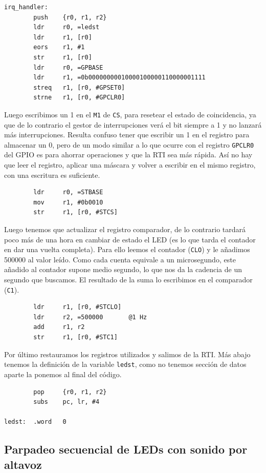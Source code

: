 \begin{lstlisting}
irq_handler:
        push    {r0, r1, r2}
        ldr     r0, =ledst
        ldr     r1, [r0]
        eors    r1, #1
        str     r1, [r0]
        ldr     r0, =GPBASE
        ldr     r1, =0b00000000010000100000110000001111
        streq   r1, [r0, #GPSET0]
        strne   r1, [r0, #GPCLR0]
\end{lstlisting}

Luego escribimos un 1 en el {\tt M1} de {\tt CS}, para resetear el estado de coincidencia, ya
que de lo contrario el gestor de interrupciones verá el bit siempre a 1 y no lanzará más
interrupciones. Resulta confuso tener que escribir un 1 en el registro para almacenar un 0, pero
de un modo similar a lo que ocurre con el registro {\tt GPCLR0} del GPIO es para ahorrar
operaciones y que la RTI sea más rápida. Así no hay que leer el registro, aplicar una máscara y
volver a escribir en el mismo registro, con una escritura es suficiente.

\begin{lstlisting}
        ldr     r0, =STBASE
        mov     r1, #0b0010
        str     r1, [r0, #STCS]
\end{lstlisting}

Luego tenemos que actualizar el registro comparador, de lo contrario tardará poco más
de una hora en cambiar de estado el LED (es lo que tarda el contador en dar una vuelta
completa). Para ello leemos el contador ({\tt CLO}) y le añadimos 500000 al valor leído. Como cada
cuenta equivale a un microsegundo, este añadido al contador supone medio segundo, lo
que nos da la cadencia de un segundo que buscamos. El resultado de la suma lo escribimos
en el comparador ({\tt C1}).

\begin{lstlisting}
        ldr     r1, [r0, #STCLO]
        ldr     r2, =500000       @1 Hz
        add     r1, r2
        str     r1, [r0, #STC1]
\end{lstlisting}

Por último restauramos los registros utilizados y salimos de la RTI. Más abajo tenemos la
definición de la variable {\tt ledst}, como no tenemos sección de datos aparte la ponemos
al final del código.

\begin{lstlisting}
        pop     {r0, r1, r2}
        subs    pc, lr, #4

ledst:  .word   0
\end{lstlisting}

\subsection{Parpadeo secuencial de LEDs con sonido por altavoz}

